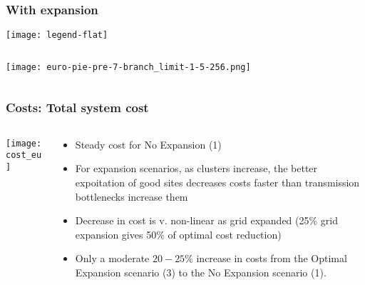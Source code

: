 \documentclass[10pt,aspectratio=169,dvipsnames]{beamer}
\let\olditem\item
\renewcommand{\item}{%
\olditem\vspace{5pt}}
\begin{document}
\begin{frame}
  \frametitle{With expansion}

  \texttt{[image: legend-flat]}
  \begin{columns}[T]

\begin{column}{8cm}

  \texttt{[image: euro-pie-pre-7-branch\_limit-1-5-256.png]}

\end{column}
\begin{column}{8cm}


\end{column}

\end{columns}


\end{frame}



\begin{frame}
  \frametitle{Costs: Total system cost}

\centering

\begin{columns}[T]
\begin{column}{8.5cm}
  \texttt{[image: cost\_eu]}

\end{column}
\begin{column}{7cm}

  \begin{itemize}
  \item Steady cost for No Expansion (1)
  \item For expansion scenarios, as clusters increase, the better expoitation of good sites decreases costs faster than transmission bottlenecks increase them
  \item Decrease in cost is v. non-linear as grid expanded (25\% grid expansion gives 50\% of optimal cost reduction)
  \item Only a moderate $20-25\%$ increase in costs from the Optimal Expansion
    scenario (3) to the No Expansion scenario (1).
  \end{itemize}

\end{column}

\end{columns}

\end{frame}
\end{document}
